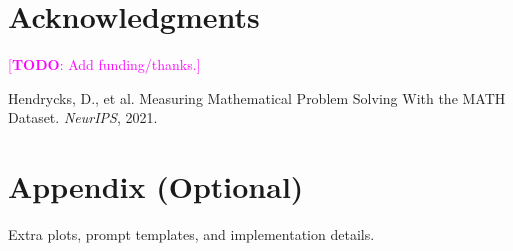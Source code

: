 \documentclass[10pt,a4paper,twocolumn]{article}
\newcommand{\todo}[1]{\textcolor{magenta}{[\textbf{TODO}: #1]}}
\begin{document}
\section*{Acknowledgments}
\todo{Add funding/thanks.}

\vspace{-2mm}
\begingroup
\small
\begin{thebibliography}{9}

Hendrycks, D., et al.
\newblock Measuring Mathematical Problem Solving With the MATH Dataset.
\newblock \emph{NeurIPS}, 2021.


\end{thebibliography}
\endgroup

\appendix
\section*{Appendix (Optional)}
Extra plots, prompt templates, and implementation details.
\end{document}
